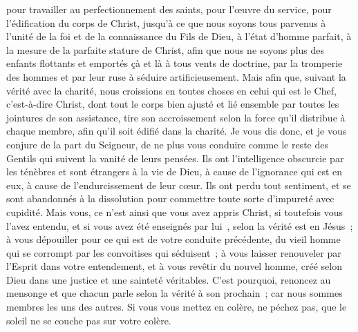 \begin{multicols}{2}
pour travailler au perfectionnement des saints, pour l'œuvre du service, pour l'édification du corps de Christ,
jusqu'à ce que nous soyons tous parvenus à l'unité de la foi et de la connaissance du Fils de Dieu, à l'état d'homme parfait, à la mesure de la parfaite stature de Christ,
afin que nous ne soyons plus des enfants flottants et emportés çà et là à tous vents de doctrine, par la tromperie des hommes et par leur ruse à séduire artificieusement.
Mais afin que, suivant la vérité avec la charité, nous croissions en toutes choses en celui qui est le Chef, c'est-à-dire Christ,
dont tout le corps bien ajusté et lié ensemble par toutes les jointures de son assistance, tire son accroissement selon la force qu'il distribue à chaque membre, afin qu'il soit édifié dans la charité.
Je vous dis donc, et je vous conjure de la part du Seigneur, de ne plus vous conduire comme le reste des Gentils qui suivent la vanité de leurs pensées.
Ils ont l'intelligence obscurcie par les ténèbres et sont étrangers à la vie de Dieu, à cause de l'ignorance qui est en eux, à cause de l'endurcissement de leur cœur.
Ils ont perdu tout sentiment, et se sont abandonnés à la dissolution pour commettre toute sorte d'impureté avec cupidité.
Mais vous, ce n'est ainsi que vous avez appris Christ,
si toutefois vous l'avez entendu, et si vous avez été enseignés par lui~, selon la vérité est en Jésus~;
à vous dépouiller pour ce qui est de votre conduite précédente, du vieil homme qui se corrompt par les convoitises qui séduisent~;
à vous laisser renouveler par l'Esprit dans votre entendement,
et à vous revêtir du nouvel homme, créé selon Dieu dans une justice et une sainteté véritables.
C'est pourquoi, renoncez au mensonge et que chacun parle selon la vérité à son prochain~; car nous sommes membres les uns des autres.
Si vous vous mettez en colère, ne péchez pas, que le soleil ne se couche pas sur votre colère.

\end{multicols}
